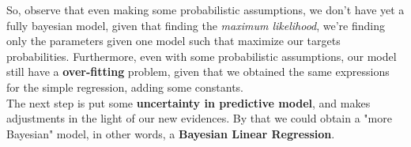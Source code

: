 \begin{frame}{\insertsubsection}

So, observe that even making some probabilistic assumptions, we don't have yet a fully bayesian model, given that finding the \textit{maximum likelihood}, we're finding only the parameters given one model such that maximize our targets probabilities. Furthermore, even with some probabilistic assumptions, our model still have a \textbf{over-fitting} problem, given that we obtained the same expressions for the simple regression, adding some constants.\\
\vspace{1em}
The next step is put some \textbf{uncertainty in predictive model}, and makes adjustments in the light of our new evidences. By that we could obtain a "more Bayesian" model, in other words, a \textcolor{UniGold}{\textbf{Bayesian Linear Regression}}.

\end{frame}

%	

